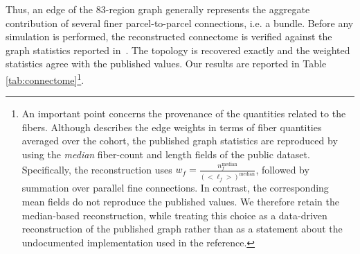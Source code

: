 Thus, an edge of the $83$-region graph generally represents the aggregate contribution of several finer parcel-to-parcel connections, i.e. a bundle. Before any simulation is performed, the reconstructed connectome is verified against the graph statistics reported in~\cite{fornari2019prion}. The topology is recovered exactly and the weighted statistics agree with the published values. Our results are reported in Table \ref{tab:connectome}\footnote{An important point concerns the provenance of the quantities related to the fibers. Although \cite{fornari2019prion} describes the edge weights in terms of fiber quantities averaged over the cohort, the published graph statistics are reproduced by using the \emph{median} fiber-count and length fields of the public dataset. Specifically, the reconstruction uses $w_f = \frac{n_f^{\mathrm{median}}} {(<\ell_f>)^{\mathrm{median}}}$, followed by summation over parallel fine connections. In contrast, the corresponding mean fields do not reproduce the published values. We therefore
retain the median-based reconstruction, while treating this choice as a data-driven reconstruction of the published graph rather than as a statement about the undocumented implementation used in the reference.}.

